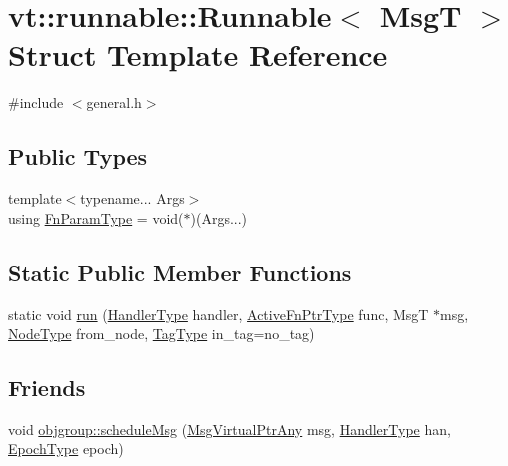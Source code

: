\hypertarget{structvt_1_1runnable_1_1_runnable}{}\section{vt\+:\+:runnable\+:\+:Runnable$<$ MsgT $>$ Struct Template Reference}
\label{structvt_1_1runnable_1_1_runnable}


{\ttfamily \#include $<$general.\+h$>$}

\subsection*{Public Types}
\begin{DoxyCompactItemize}
\item 
{\footnotesize template$<$typename... Args$>$ }\\using \hyperlink{structvt_1_1runnable_1_1_runnable_aaad8725f31ab762ded7babaaf83574a3}{Fn\+Param\+Type} = void($\ast$)(Args...)
\end{DoxyCompactItemize}
\subsection*{Static Public Member Functions}
\begin{DoxyCompactItemize}
\item 
static void \hyperlink{structvt_1_1runnable_1_1_runnable_a8d99f9d7b1b29545b1595f40a1bd2845}{run} (\hyperlink{namespacevt_af64846b57dfcaf104da3ef6967917573}{Handler\+Type} handler, \hyperlink{namespacevt_a70e19bd64d031e65083c2125b2c65426}{Active\+Fn\+Ptr\+Type} func, MsgT $\ast$msg, \hyperlink{namespacevt_a866da9d0efc19c0a1ce79e9e492f47e2}{Node\+Type} from\+\_\+node, \hyperlink{namespacevt_a84ab281dae04a52a4b243d6bf62d0e52}{Tag\+Type} in\+\_\+tag=no\+\_\+tag)
\end{DoxyCompactItemize}
\subsection*{Friends}
\begin{DoxyCompactItemize}
\item 
void \hyperlink{structvt_1_1runnable_1_1_runnable_a929210f79e51656f12e9b8458dc57887}{objgroup\+::schedule\+Msg} (\hyperlink{namespacevt_a54674b9f819f4f3a652c6f78d9b62aaf}{Msg\+Virtual\+Ptr\+Any} msg, \hyperlink{namespacevt_af64846b57dfcaf104da3ef6967917573}{Handler\+Type} han, \hyperlink{namespacevt_a985a5adf291c34a3ca263b3378388236}{Epoch\+Type} epoch)
\end{DoxyCompactItemize}


